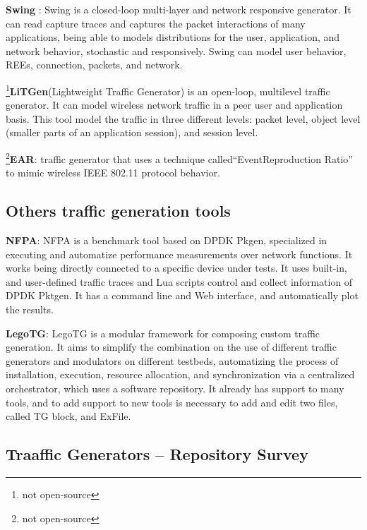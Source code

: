 \textbf{Swing}\cite{swing-paper} \cite{web-swing}: Swing is a closed-loop multi-layer and network responsive generator. It can read capture traces and captures the packet interactions of many applications, being able to models distributions for the user, application, and network behavior, stochastic and responsively. Swing can model user behavior, REEs, connection, packets, and network. 

\footnote{not open-source}\textbf{LiTGen}(Lightweight Traffic Generator)\cite{litgen-paper} is an open-loop, multilevel traffic generator. It can model wireless network traffic in a peer user and application basis. This tool model the traffic in three different levels: packet level, object level (smaller parts of an application session), and session level.


\footnote{not open-source}\textbf{EAR}\cite{ear-paper}: traffic generator that uses a technique called“EventReproduction Ratio” to mimic wireless IEEE 802.11 protocol behavior. 



\subsection{Others traffic generation tools}


\textbf{NFPA}\cite{nfpa-paper}:  NFPA is a benchmark tool based on DPDK Pkgen, specialized in executing and automatize performance measurements over network functions. It works being directly connected to a specific device under tests. It uses built-in, and user-defined traffic traces and Lua scripts control and collect information of DPDK Pktgen. It has a command line and Web interface, and automatically plot the results. 

\textbf{LegoTG}\cite{legotg-paper}:  LegoTG is a modular framework for composing custom traffic generation. It aims to simplify the combination on the use of different traffic generators and modulators on different testbeds, automatizing the process of installation, execution, resource allocation, and synchronization via a centralized orchestrator, which uses a software repository. It already has support to many tools, and to add support to new tools is necessary to add and edit two files, called TG block, and ExFile.


\subsection{Traaffic Generators -- Repository Survey}

